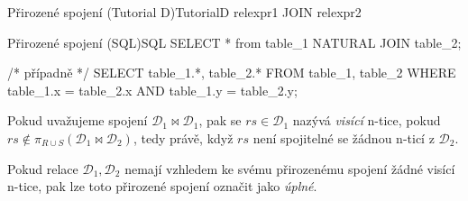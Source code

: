 \begin{upcode}{Přirozené spojení (Tutorial D)}{}{TutorialD}
relexpr1 JOIN relexpr2
\end{upcode}
\begin{upcode}{Přirozené spojení (SQL)}{}{SQL}
SELECT * from table_1 NATURAL JOIN table_2;

/* případně */
SELECT	table_1.*, table_2.*
FROM	table_1, table_2
WHERE	table_1.x = table_2.x AND table_1.y = table_2.y;
\end{upcode}
\begin{uptheorem}
Pokud uvažujeme spojení $\mathcal{D}_{1} \Join \mathcal{D}_{1}$, pak se $rs \in \mathcal{D}_{1}$ nazývá \textit{visící} n-tice, pokud $rs \notin \pi_{R \cup S} (\mathcal{D}_{1} \Join \mathcal{D}_{2})$, tedy právě, když $rs$ není spojitelné se žádnou n-ticí z $\mathcal{D}_{2}$.
\end{uptheorem}
\begin{uptheorem}
Pokud relace $\mathcal{D}_{1}, \mathcal{D}_{2}$ nemají vzhledem ke svému přirozenému spojení žádné visící n-tice, pak lze toto přirozené spojení označit jako \textit{úplné}.
\end{uptheorem}

